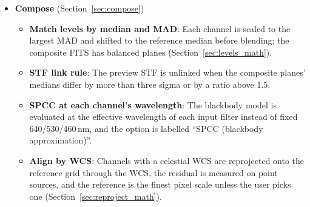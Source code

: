 \documentclass[11pt,a4paper]{article}
\newcommand{\code}[1]{\texttt{\small #1}}
\begin{document}
\begin{itemize}[nosep]
\begin{itemize}[nosep]
        \item \textbf{Dark scale from exposures}: The Calibration tab no longer asks for a dark ratio; the scale is the exposure ratio when a bias is present and 1 otherwise. Exposure is read from the merged primary and SCI header, so a JWST \code{EXPOSURE=1} (a count) is no longer read as one second.
        \item \textbf{Flat-darks and temperature groups}: Flat-darks are a fourth master; darks are grouped by sensor temperature and each light takes the nearest group.
        \item \textbf{Provenance cards}: Stack, Pipeline and drizzle outputs write \code{NCOMBINE}, \code{EXPTIME}, \code{TOTEXP}, \code{ABCOMB}, \code{ABREJECT}, \code{ABNORM} and \code{ABDRZSCL}.
        \item \textbf{Combine correctness}: Noise weights are divided by the square of the normalization scale; frames of different sizes are refused without alignment; the cosmetic zero-MAD fallback uses the 90th percentile; the Masked Stretch shadow guard no longer depends on the data range; cosmetic correction detects Bayer data from the header.
        \item \textbf{Unregistered frames excluded}: The batch Pipeline leaves out every frame it could not register and reports each one by its position in the channel; an unknown alignment method name sent to Stack, Compose Align or the aligned-channel export is an error instead of a silent phase correlation.
        \end{itemize}
    \item \textbf{Compose} (Section~\ref{sec:compose})
        \begin{itemize}[nosep]
        \item \textbf{Match levels by median and MAD}: Each channel is scaled to the largest MAD and shifted to the reference median before blending; the composite FITS has balanced planes (Section~\ref{sec:levels_math}).
        \item \textbf{STF link rule}: The preview STF is unlinked when the composite planes' medians differ by more than three sigma or by a ratio above 1.5.
        \item \textbf{SPCC at each channel's wavelength}: The blackbody model is evaluated at the effective wavelength of each input filter instead of fixed 640/530/460\,nm, and the option is labelled ``SPCC (blackbody approximation)''.
        \item \textbf{Align by WCS}: Channels with a celestial WCS are reprojected onto the reference grid through the WCS, the residual is measured on point sources, and the reference is the finest pixel scale unless the user picks one (Section~\ref{sec:reproject_math}).

\end{itemize}
\end{itemize}
\end{document}
